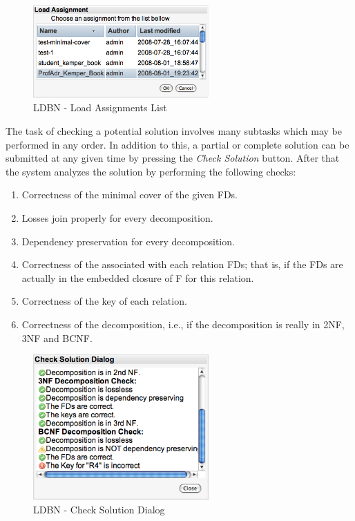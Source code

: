 \begin{figure}[h]
	\begin{center}
		\includegraphics[width=0.6\textwidth]{./img/screen02.png}
		\caption{LDBN - Load Assignments List}
		\label{fig:screen02}
	\end{center}
\end{figure}

The task of checking a potential solution
involves many subtasks which may be performed in any order. In addition to this,  a partial or complete 
solution can be submitted at any given time by pressing the \textit{Check Solution} button. 
After that the system analyzes the solution by performing the following checks:
\begin{enumerate}
	\item Correctness of the minimal cover of the given FDs. 
	\item Losses join properly for every decomposition.
	\item Dependency preservation for every decomposition.
	\item Correctness of the associated with each relation FDs; that is, if the FDs are actually in the embedded closure of F for this relation.
	\item Correctness of the key of each relation.
	\item Correctness of the decomposition, i.e., if the decomposition is really in 2NF, 3NF and BCNF.
\end{enumerate}

\begin{figure}[h]
	\begin{center}
		\includegraphics[width=0.6\textwidth]{./img/screen03.png}
		\caption{LDBN - Check Solution Dialog}
		\label{fig:screen03}
	\end{center}
\end{figure}


